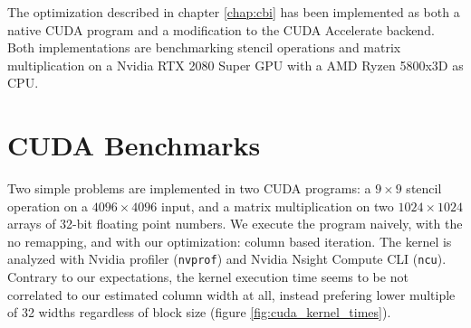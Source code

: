 The optimization described in chapter \ref{chap:cbi} has been implemented as both a native CUDA program and a modification to the CUDA Accelerate backend.
Both implementations are benchmarking stencil operations and matrix multiplication on a Nvidia RTX 2080 Super GPU with a AMD Ryzen 5800x3D as CPU.

\section{CUDA Benchmarks}

Two simple problems are implemented in two CUDA programs: a $9 \times 9$ stencil operation on a $4096 \times 4096$ input, and a matrix multiplication on two $1024 \times 1024$ arrays of 32-bit floating point numbers.
We execute the program naively, with the no remapping, and with our optimization: column based iteration.
The kernel is analyzed with Nvidia profiler (\texttt{nvprof}) and Nvidia Nsight Compute CLI (\texttt{ncu}).
Contrary to our expectations, the kernel execution time seems to be not correlated to our estimated column width at all, instead prefering lower multiple of 32 widths regardless of block size (figure \ref{fig:cuda_kernel_times}).


